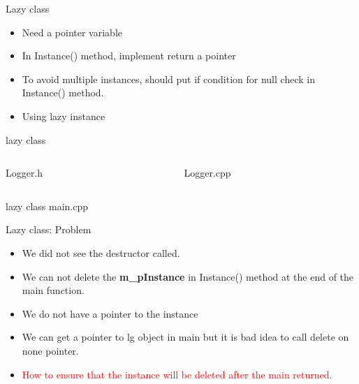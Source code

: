 \documentclass[13pt]{beamer}
\begin{document}
\begin{frame}{Lazy class}
\begin{itemize}
\setlength\itemsep{1em}

\item Need a pointer variable

\item In Instance() method, implement return a pointer

\item To avoid multiple instances, should put if condition for null check in Instance() method.

\item Using lazy instance
\end{itemize}
\end{frame}

\begin{frame}{lazy class}
\begin{columns}[T]
\begin{column}{.48\textwidth}
Logger.h
\lstset{basicstyle=\tiny,style=myCustomCppStyle}

\end{column}

\begin{column}{.48\textwidth}
Logger.cpp
\lstset{basicstyle=\tiny,style=myCustomCppStyle}

\end{column}
\end{columns}
\end{frame}

\begin{frame}{lazy class}
main.cpp
\lstset{basicstyle=\tiny,style=myCustomCppStyle}

\end{frame}

\begin{frame}{Lazy class: Problem}
\begin{itemize}
\setlength\itemsep{1em}

\item We did not see the destructor called.

\item We can not delete the \textbf{m\_pInstance} in Instance() method at the end of the main function.

\item We do not have a pointer to the instance

\item We can get a pointer to lg object in main but it is bad idea to call delete on none pointer.

\item \textcolor{red}{How to ensure that the instance will be deleted after the main returned.}
\end{itemize}
\end{frame}
\end{document}
